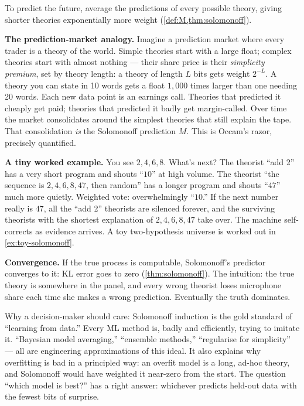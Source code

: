 \documentclass[12pt,a4paper]{article}
\theoremstyle{plain}
\theoremstyle{definition}
\begin{document}
\begin{intuition}
To predict the future, average the predictions of every possible
theory, giving shorter theories exponentially more weight
(\cref{def:M,thm:solomonoff}).

\textbf{The prediction-market analogy.}  Imagine a prediction market
where every trader is a theory of the world.  Simple theories start
with a large float; complex theories start with almost nothing ---
their share price is their \emph{simplicity premium}, set by theory
length: a theory of length $L$ bits gets weight $2^{-L}$.  A theory
you can state in 10 words gets a float $1{,}000$ times larger than
one needing 20 words.  Each new data point is an earnings call.
Theories that predicted it cheaply get paid; theories that predicted
it badly get margin-called.  Over time the market consolidates around
the simplest theories that still explain the tape.  That
consolidation \emph{is} the Solomonoff prediction $M$.  This is
Occam's razor, precisely quantified.

\textbf{A tiny worked example.}  You see $2, 4, 6, 8$.  What's next?
The theorist ``add 2'' has a very short program and shouts
``$10$'' at high volume.  The theorist ``the sequence is
$2,4,6,8,47$, then random'' has a longer program and shouts ``$47$''
much more quietly.  Weighted vote: overwhelmingly ``$10$.''  If the
next number really is $47$, all the ``add 2'' theorists are silenced
forever, and the surviving theorists with the shortest explanation of
$2,4,6,8,47$ take over.  The machine self-corrects as evidence
arrives.  A toy two-hypothesis universe is worked out in
\cref{ex:toy-solomonoff}.

\textbf{Convergence.}  If the true process is computable, Solomonoff's
predictor converges to it: KL error goes to zero
(\cref{thm:solomonoff}).  The intuition: the true theory is somewhere
in the panel, and every wrong theorist loses microphone share each
time she makes a wrong prediction.  Eventually the truth dominates.

Why a decision-maker should care: Solomonoff induction is the gold
standard of ``learning from data.''  Every ML method is, badly and
efficiently, trying to imitate it.  ``Bayesian model averaging,''
``ensemble methods,'' ``regularise for simplicity'' --- all are
engineering approximations of this ideal.  It also explains why
overfitting is bad in a principled way: an overfit model is a long,
ad-hoc theory, and Solomonoff would have weighted it near-zero from
the start.  The question ``which model is
best?'' has a right answer: whichever predicts held-out data with the
fewest bits of surprise.
\end{intuition}
\end{document}
